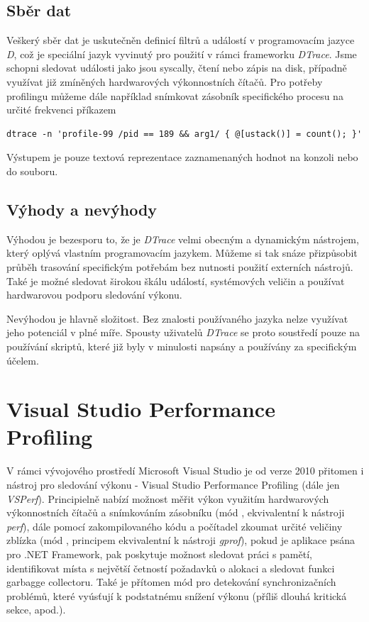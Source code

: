 \documentclass[czech,BP]{thesiskiv}
\begin{document}
\subsection*{Sběr dat}

Veškerý sběr dat je uskutečněn definicí filtrů a událostí v programovacím jazyce \emph{D}, což je speciální jazyk vyvinutý pro použití v rámci frameworku \emph{DTrace}. Jsme schopni sledovat události jako jsou syscally, čtení nebo zápis na disk, případně využívat již zmíněných hardwarových výkonnostních čítačů. Pro potřeby profilingu můžeme dále například snímkovat zásobník specifického procesu na určité frekvenci příkazem

\lstset{escapechar=@,style=custombash}
\begin{lstlisting}
dtrace -n 'profile-99 /pid == 189 && arg1/ { @[ustack()] = count(); }'
\end{lstlisting}

Výstupem je pouze textová reprezentace zaznamenaných hodnot na konzoli nebo do souboru.

\subsection*{Výhody a nevýhody}

Výhodou je bezesporu to, že je \emph{DTrace} velmi obecným a dynamickým nástrojem, který oplývá vlastním programovacím jazykem. Můžeme si tak snáze přizpůsobit průběh trasování specifickým potřebám bez nutnosti použití externích nástrojů. Také je možné sledovat širokou škálu událostí, systémových veličin a používat hardwarovou podporu sledování výkonu.

Nevýhodou je hlavně složitost. Bez znalosti používaného jazyka nelze využívat jeho potenciál v plné míře. Spousty uživatelů \emph{DTrace} se proto soustředí pouze na používání skriptů, které již byly v minulosti napsány a používány za specifickým účelem.




\section{Visual Studio Performance Profiling}

V rámci vývojového prostředí Microsoft Visual Studio je od verze 2010 přitomen i nástroj pro sledování výkonu - Visual Studio Performance Profiling (dále jen \emph{VSPerf}). Principielně nabízí možnost měřit výkon využitím hardwarových výkonnostních čítačů a snímkováním zásobníku (mód , ekvivalentní k nástroji \emph{perf}), dále pomocí zakompilovaného kódu a počítadel zkoumat určité veličiny zblízka (mód , principem ekvivalentní k nástroji \emph{gprof}), pokud je aplikace psána pro .NET Framework, pak poskytuje možnost sledovat práci s pamětí, identifikovat místa s největší četností požadavků o alokaci a sledovat funkci garbagge collectoru. Také je přítomen mód pro detekování synchronizačních problémů, které vyúsťují k podstatnému snížení výkonu (příliš dlouhá kritická sekce, apod.).
\end{document}
